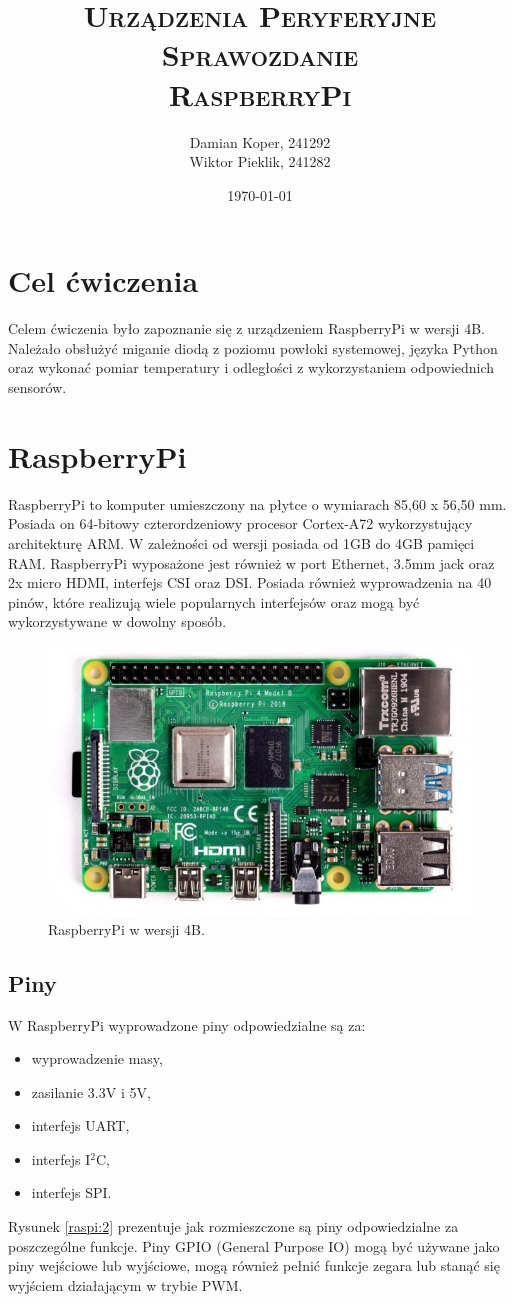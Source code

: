 \documentclass[12pt]{article}
\title{ 
    \vspace*{55mm}
    \textsc{
        \textbf{Urządzenia Peryferyjne}\\
        \large Sprawozdanie  \\
        \Large RaspberryPi
        }
}
\author{
Damian Koper,  241292\\
Wiktor Pieklik, 241282\\
}
\date{\today}
\begin{document}
\maketitle

\newpage
\localtableofcontents
\listoffigures
\lstlistoflistings

\newpage

\section{Cel ćwiczenia}
Celem ćwiczenia było zapoznanie się z urządzeniem RaspberryPi w wersji 4B\cite{raspi}. Należało obsłużyć miganie diodą z poziomu powłoki systemowej, języka Python oraz wykonać pomiar temperatury i odległości z wykorzystaniem odpowiednich sensorów.

\section{RaspberryPi}
RaspberryPi to komputer umieszczony na płytce o wymiarach 85,60 x 56,50 mm. Posiada on 64-bitowy czterordzeniowy procesor Cortex-A72 wykorzystujący architekturę ARM\cite{arm}. W zależności od wersji posiada od 1GB do 4GB pamięci RAM. RaspberryPi wyposażone jest również w port Ethernet, 3.5mm jack oraz 2x micro HDMI, interfejs CSI oraz DSI. Posiada również wyprowadzenia na 40 pinów, które realizują wiele popularnych interfejsów oraz mogą być wykorzystywane w dowolny sposób.

\begin{figure}[h]
  \centering
  \includegraphics[width=0.5\linewidth]{raspi}
  \caption{RaspberryPi w wersji 4B\cite{raspi:img}.}
  \label{raspi:1}
\end{figure}
\clearpage
\subsection{Piny}
W RaspberryPi wyprowadzone piny odpowiedzialne są za:
\begin{itemize}[noitemsep]
  \item wyprowadzenie masy,
  \item zasilanie 3.3V i 5V,
  \item interfejs UART,
  \item interfejs I$^2$C,
  \item interfejs SPI.
\end{itemize}
Rysunek \ref{raspi:2} prezentuje jak rozmieszczone są piny odpowiedzialne za poszczególne funkcje. Piny GPIO (General Purpose IO) mogą być używane jako piny wejściowe lub wyjściowe, mogą również pełnić funkcje zegara lub stanąć się wyjściem działającym w trybie PWM.
\end{document}
